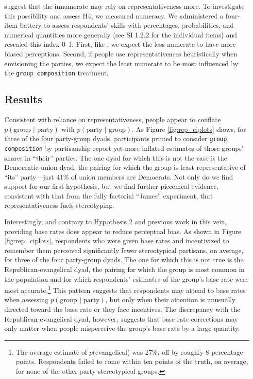 \documentclass[12pt, letterpaper]{article}
\begin{document}
\citet{sides2007b} suggest that the innumerate may rely on representativeness more. To investigate this possibility and assess H4, we measured numeracy. We administered a four-item battery to assess respondents' skills with percentages, probabilities, and numerical quantities more generally (see SI 1.2.2 for the individual items) and rescaled this index 0--1. First, like \citet{sides2007b}, we expect the less numerate to have more biased perceptions. Second, if people use representativeness heuristically when envisioning the parties, we expect the least numerate to be most influenced by the {\tt group composition} treatment.

\subsection{Results}

Consistent with reliance on representativeness, people appear to conflate $p(\text{group | party})$ with $p(\text{party | group})$. As Figure \ref{fig:rep_ciplots} shows, for three of the four party-group dyads, participants primed to consider {\tt group composition} by partisanship report yet-more inflated estimates of those groups' shares in ``their'' parties. The one dyad for which this is not the case is the Democratic-union dyad, the pairing for which the group is least representative of ``its'' party---just 41\% of union members are Democrats. Not only do we find support for our first hypothesis, but we find further piecemeal evidence, consistent with that from the fully factorial ``James'' experiment, that representativeness fuels stereotyping. 

Interestingly, and contrary to Hypothesis 2 and previous work in this vein, providing base rates does appear to reduce perceptual bias. As shown in Figure \ref{fig:rep_ciplots}, respondents who were given base rates and incentivized to remember them perceived significantly fewer stereotypical partisans, on average, for three of the four party-group dyads. The one for which this is not true is the Republican-evangelical dyad, the pairing for which the group is most common in the population and for which respondents' estimates of the group's base rate were most accurate.\footnote{The average estimate of $p$(evangelical) was 27\%, off by roughly 8 percentage points. Respondents failed to come within ten points of the truth, on average, for none of the other party-stereotypical groups.} This pattern suggests that respondents may attend to base rates when assessing $p(\text{group | party})$, but only when their attention is unusually directed toward the base rate or they face incentives. The discrepancy with the Republican-evangelical dyad, however, suggests that base rate corrections may only matter when people misperceive the group's base rate by a large quantity.
\end{document}
